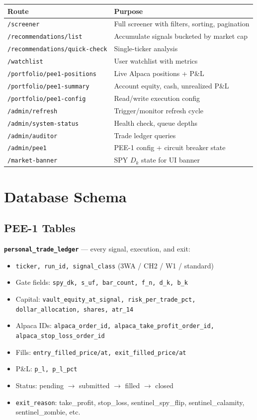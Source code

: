 \documentclass[11pt, a4paper]{article}
\begin{document}
\begin{longtable}{@{}p{6cm}p{8.5cm}@{}}
\toprule
\textbf{Route} & \textbf{Purpose} \\
\midrule
\endhead
\texttt{/screener} & Full screener with filters, sorting, pagination \\
\texttt{/recommendations/list} & Accumulate signals bucketed by market cap \\
\texttt{/recommendations/quick-check} & Single-ticker analysis \\
\texttt{/watchlist} & User watchlist with metrics \\
\texttt{/portfolio/pee1-positions} & Live Alpaca positions + P\&L \\
\texttt{/portfolio/pee1-summary} & Account equity, cash, unrealized P\&L \\
\texttt{/portfolio/pee1-config} & Read/write execution config \\
\texttt{/admin/refresh} & Trigger/monitor refresh cycle \\
\texttt{/admin/system-status} & Health check, queue depths \\
\texttt{/admin/auditor} & Trade ledger queries \\
\texttt{/admin/pee1} & PEE-1 config + circuit breaker state \\
\texttt{/market-banner} & SPY $D_k$ state for UI banner \\
\bottomrule
\end{longtable}

\section{Database Schema}

\subsection{PEE-1 Tables}

\textbf{\texttt{personal\_trade\_ledger}} --- every signal, execution, and exit:
\begin{itemize}[nosep]
  \item \texttt{ticker, run\_id, signal\_class} (3WA / CH2 / W1 / standard)
  \item Gate fields: \texttt{spy\_dk, s\_uf, bar\_count, f\_n, d\_k, b\_k}
  \item Capital: \texttt{vault\_equity\_at\_signal, risk\_per\_trade\_pct, dollar\_allocation, shares, atr\_14}
  \item Alpaca IDs: \texttt{alpaca\_order\_id, alpaca\_take\_profit\_order\_id, alpaca\_stop\_loss\_order\_id}
  \item Fills: \texttt{entry\_filled\_price/at, exit\_filled\_price/at}
  \item P\&L: \texttt{p\_l, p\_l\_pct}
  \item Status: pending $\to$ submitted $\to$ filled $\to$ closed
  \item \texttt{exit\_reason}: take\_profit, stop\_loss, sentinel\_spy\_flip, sentinel\_calamity, sentinel\_zombie, etc.
\end{itemize}
\end{document}
